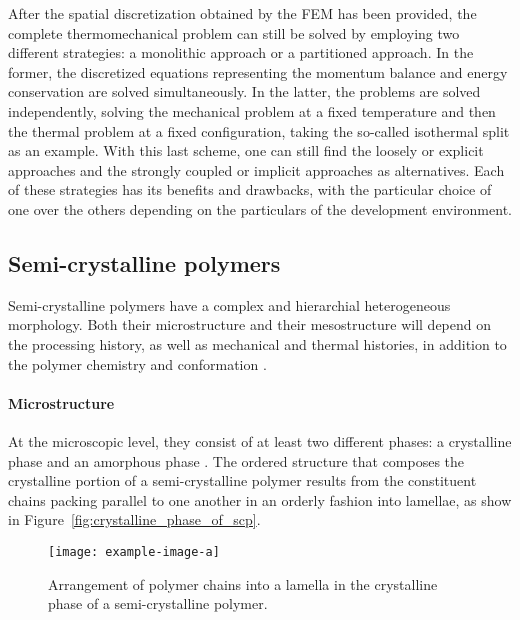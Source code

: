 After the spatial discretization obtained by the FEM has been provided, the complete thermomechanical problem can still be solved by employing two different strategies: a monolithic approach or a partitioned approach.
In the former, the discretized equations representing the momentum balance and energy conservation are solved simultaneously.
In the latter, the problems are solved independently, solving the mechanical problem at a fixed temperature and then the thermal problem at a fixed configuration, taking the so-called isothermal split as an example.
With this last scheme, one can still find the loosely or explicit approaches and the strongly coupled or implicit approaches as alternatives.
Each of these strategies has its benefits and drawbacks, with the particular choice of one over the others depending on the particulars of the development environment.

\subsection{Semi-crystalline polymers}

Semi-crystalline polymers have a complex and hierarchial heterogeneous morphology.
Both their microstructure and their mesostructure will depend on the processing history, as well as mechanical and thermal histories, in addition to the polymer chemistry and conformation \citep{khouryMorphologyCrystallineSynthetic1976,cangemiTwoPhaseModelMechanical2001,hoffmanAnalysisRelaxationsPolychlorotrifluoroethylene2007}.

\paragraph{Microstructure}
At the microscopic level, they consist of at least two different phases: a crystalline phase and an amorphous phase \citep{khouryMorphologyCrystallineSynthetic1976}.
The ordered structure that composes the crystalline portion of a semi-crystalline polymer results from the constituent chains packing parallel to one another in an orderly fashion into lamellae, as show in Figure~\eqref{fig:crystalline_phase_of_scp}.

\begin{figure}[htbp]
	\texttt{[image: example-image-a]}
	\caption{Arrangement of polymer chains into a lamella in the crystalline phase of a semi-crystalline polymer.}
\label{fig:crystalline_phase_of_scp}
\end{figure}

